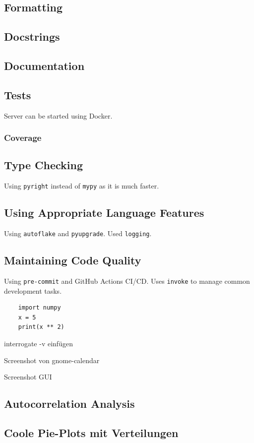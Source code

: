 \documentclass{prettytex/ox/mmsc-special-topic}
\begin{document}
  \subsection{Formatting}
  \subsection{Docstrings}
  \subsection{Documentation}
  \subsection{Tests}
  Server can be started using Docker.

  \subsubsection{Coverage}
  \subsection{Type Checking}
  Using \texttt{pyright} instead of \texttt{mypy} as it is much faster.
  \subsection{Using Appropriate Language Features}
  Using \texttt{autoflake} and \texttt{pyupgrade}.
  Used \texttt{logging}.
  \subsection{Maintaining Code Quality}
  Using \texttt{pre-commit} and GitHub Actions CI/CD.
  Uses \texttt{invoke} to manage common development tasks.

  \begin{verbatim}
    import numpy
    x = 5
    print(x ** 2)
  \end{verbatim}

  interrogate -v einfügen

  Screenshot von gnome-calendar

  Screenshot GUI

  \subsection{Autocorrelation Analysis}
  \subsection{Coole Pie-Plots mit Verteilungen}
\end{document}
